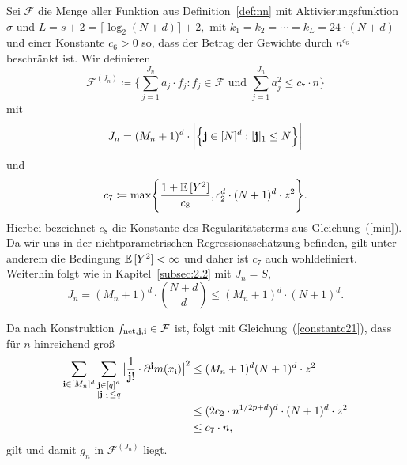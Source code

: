 {Sei $\mathcal{F}$ die Menge aller Funktion aus Definition~\ref{def:nn} mit Aktivierungsfunktion $\sigma$ und $L = s + 2 = \lceil\log_2(N + d)\rceil + 2,$ mit $k_1 = k_2 = \cdots = k_L = 24 \cdot (N + d)$ und einer Konstante $c_6 > 0$ so, dass der Betrag der Gewichte durch $n^{c_{6}}$ beschränkt ist. Wir definieren
$$ \mathcal{F}^{(J_n)} \coloneqq \biggl\{\sum_{j = 1}^{J_n} a_j \cdot f_j : f_j \in \mathcal{F} \text{ und } \sum_{j = 1}^{J_n} a_j^2 \leq c_7 \cdot n \biggr\}$$
mit 
$$
J_n = (M_n + 1)^d \cdot \bigg|\Bigl\{\mathbf{j} \in [N]^d : |\mathbf{j}|_1 \leq N \Bigr\}\bigg|$$
und
\begin{equation}
\label{constantc21}
\begin{split}
c_7 \coloneqq \max\Biggl\{\frac{1 + \mathbb{E}\,[Y^2]}{c_8}, c_2^d \cdot (N + 1)^d \cdot z^2\Biggr\}.
\end{split}
\end{equation}
Hierbei bezeichnet $c_8$ die Konstante des Regularitätsterms aus Gleichung~(\ref{min}). Da wir uns in der nichtparametrischen Regressionsschätzung befinden, gilt unter anderem die Bedingung $\mathbb{E}\,[Y^2] < \infty$ und daher ist $c_7$ auch wohldefiniert. 
Weiterhin folgt wie in Kapitel~\ref{subsec:2.2} mit $J_n = S$,
\begin{equation}
\label{jn}
J_n =  (M_n + 1)^d \cdot \binom{N + d}{d} \leq (M_n + 1)^d \cdot (N + 1)^d.
\end{equation}

Da nach Konstruktion $f_{\mathrm{net},\mathbf{j},\mathbf{i}} \in \mathcal{F}$ ist, folgt mit Gleichung~(\ref{constantc21}), dass für $n$ hinreichend groß
\begin{equation*}
\begin{split}
\sum_{\mathbf{i} \in [M_n]^d} \sum_{\substack{ \mathbf{j} \in [q]^d \\ |\mathbf{j}|_1 \leq q}} \big| \frac{1}{\mathbf{j}!} \cdot \partial^{\mathbf{j}}m(x_{\mathbf{i}})\big|^2 & \leq (M_n + 1)^d (N + 1)^d \cdot z^2 \\
& \leq (2 c_2 \cdot n^{1/2p + d})^d \cdot (N + 1)^d \cdot z^2 \\
& \leq c_7 \cdot n,
\end{split}
\end{equation*}
gilt und damit $g_n$ in $\mathcal{F}^{(J_n)}$ liegt. 

}
